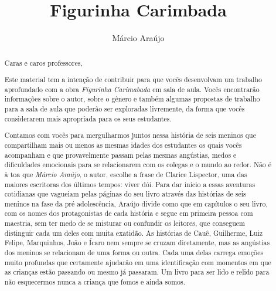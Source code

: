\documentclass[11pt]{extarticle}
\newcommand{\AutorLivro}{Márcio Araújo}
\newcommand{\TituloLivro}{Figurinha Carimbada}
\newcommand{\colaborador}{Gabriela Karam}
\begin{document}
\title{\TituloLivro}
\author{\AutorLivro}
\def\authornotes{\colaborador}

\date{}
\maketitle


\tableofcontents


\begin{abstract}

Caras e caros professores,

Este material tem a intenção de contribuir para que vocês desenvolvam um trabalho aprofundado com a obra \textit{Figurinha Carimabada} em sala de aula.
Vocês encontrarão informações sobre o autor, sobre o gênero e também 
algumas propostas de trabalho para a sala de aula que poderão ser exploradas livremente, 
da forma que vocês considerarem mais apropriada para os seus estudantes.

Contamos com vocês para mergulharmos juntos nessa história de seis meninos que compartilham mais ou menos as mesmas idades dos estudantes os quais vocês acompanham e que provavelmente passam pelas mesmas angústias, medos e dificuldades emocionais para se relacionarem com os colegas e o mundo ao redor. Não é à toa que \textit{Márcio Araújo}, o autor, escolhe a frase de Clarice Lispector, uma das maiores escritoras dos últimos tempos: viver dói. Para dar início a essas aventuras cotidianas que vagueiam pelas páginas do seu livro através das histórias de seis meninos na fase da pré adolescência, Araújo divide como que em capítulos o seu livro, com os nomes dos protagonistas de cada história e segue em primeira pessoa com maestria, sem ter medo de se misturar ou confundir os leitores, que conseguem distinguir cada um deles com muita exatidão. As histórias de Cauê, Guilherme, Luiz Felipe, Marquinhos, João e Ícaro nem sempre se cruzam diretamente, mas as angústias dos meninos se relacionam de uma forma ou outra. Cada uma delas carrega emoções muito profundas que certamente ajudarão em uma identificação com momentos em que as crianças estão passando ou mesmo já passaram. Um livro para ser lido e relido para não esquecermos nunca a criança que fomos e ainda somos.


\end{abstract}
\end{document}
